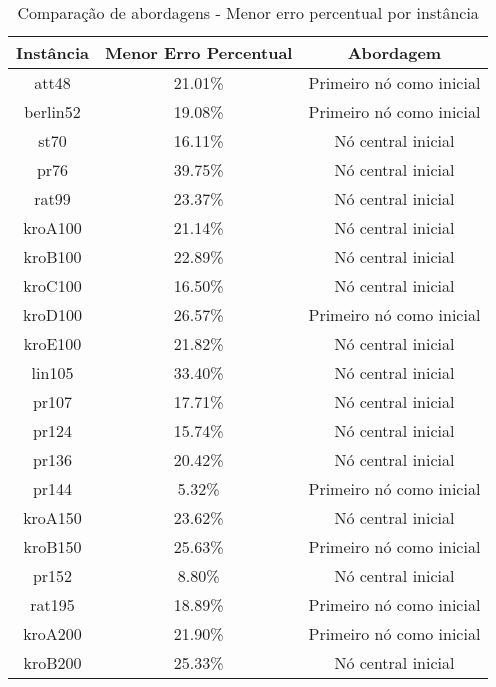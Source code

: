 \begin{table}[H]
    \centering
    \begin{tabular}{|c|c|c|} \hline
    \textbf{Instância} & \textbf{Menor Erro Percentual} & \textbf{Abordagem} \\ \hline
        att48       & 21.01\%   & Primeiro nó como inicial \\ \hline
        berlin52    & 19.08\%   & Primeiro nó como inicial \\ \hline
        st70        & 16.11\%   & Nó central inicial       \\ \hline
        pr76        & 39.75\%   & Nó central inicial       \\ \hline
        rat99       & 23.37\%   & Nó central inicial       \\ \hline
        kroA100     & 21.14\%   & Nó central inicial       \\ \hline
        kroB100     & 22.89\%   & Nó central inicial       \\ \hline
        kroC100     & 16.50\%   & Nó central inicial       \\ \hline
        kroD100     & 26.57\%   & Primeiro nó como inicial \\ \hline
        kroE100     & 21.82\%   & Nó central inicial       \\ \hline
        lin105      & 33.40\%   & Nó central inicial       \\ \hline
        pr107       & 17.71\%   & Nó central inicial       \\ \hline
        pr124       & 15.74\%   & Nó central inicial       \\ \hline
        pr136       & 20.42\%   & Nó central inicial       \\ \hline
        pr144       & 5.32\%    & Primeiro nó como inicial \\ \hline
        kroA150     & 23.62\%   & Nó central inicial       \\ \hline
        kroB150     & 25.63\%   & Primeiro nó como inicial \\ \hline
        pr152       & 8.80\%    & Nó central inicial       \\ \hline
        rat195      & 18.89\%   & Primeiro nó como inicial \\ \hline
        kroA200     & 21.90\%   & Primeiro nó como inicial \\ \hline
        kroB200     & 25.33\%   & Nó central inicial       \\ \hline
    \end{tabular}
    \caption{Comparação de abordagens - Menor erro percentual por instância}
    \label{tab:comparison}
    \end{table}